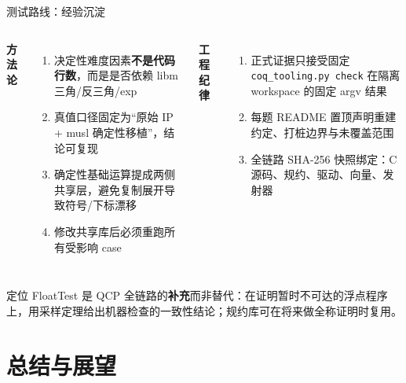 \documentclass[UTF8,aspectratio=169]{ctexbeamer}
\begin{document}
\begin{frame}{测试路线：经验沉淀}
  \begin{columns}[T]
    \textbf{方法论}
    \begin{enumerate}\small
      \item 决定性难度因素\textbf{不是代码行数}，而是是否依赖 libm 三角/反三角/exp
      \item 真值口径固定为``原始 IP + musl 确定性移植''，结论可复现
      \item 确定性基础运算提成两侧共享层，避免复制展开导致符号/下标漂移
      \item 修改共享库后必须重跑所有受影响 case
    \end{enumerate}
    \textbf{工程纪律}
    \begin{enumerate}\small
      \setcounter{enumi}{4}
      \item 正式证据只接受固定 \texttt{coq\_tooling.py check} 在隔离 workspace 的固定 argv 结果
      \item 每题 README 置顶声明重建约定、打桩边界与未覆盖范围
      \item 全链路 SHA-256 快照绑定：C 源码、规约、驱动、向量、发射器
    \end{enumerate}
  \end{columns}
  \vspace{0.8em}
  \begin{block}{定位}
    \small FloatTest 是 QCP 全链路的\textbf{补充}而非替代：在证明暂时不可达的浮点程序上，用采样定理给出机器检查的一致性结论；规约库可在将来做全称证明时复用。
  \end{block}
\end{frame}

\section{总结与展望}
\end{document}
